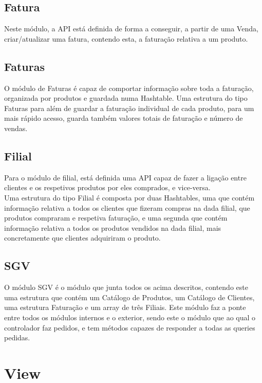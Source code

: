 \documentclass[a4paper]{report}
\begin{document}
\subsection{Fatura}

Neste módulo, a API está definida de forma a conseguir, a partir de uma Venda,
criar/atualizar uma fatura, contendo esta, a faturação relativa a um produto.

\subsection{Faturas}

O módulo de Faturas é capaz de comportar informação sobre toda a faturação,
organizada por produtos e guardada numa Hashtable. Uma estrutura do tipo Faturas
para além de guardar a faturação individual de cada produto, para um mais rápido 
acesso, guarda também valores totais de faturação e número de vendas.

\subsection{Filial}

Para o módulo de filial, está definida uma API capaz de fazer a ligação entre 
clientes e os respetivos produtos por eles comprados, e vice-versa.\\
Uma estrutura do tipo Filial é composta por duas Hashtables, uma que contém
informação relativa a todos os clientes que fizeram compras na dada filial, 
que produtos compraram e respetiva faturação, e uma segunda que contém 
informação relativa a todos os produtos vendidos na dada filial, mais 
concretamente que clientes adquiriram o produto.

\subsection{SGV}

O módulo SGV é o módulo que junta todos os acima descritos, contendo este uma estrutura
que contém um Catálogo de Produtos, um Catálogo de Clientes, uma estrutura Faturação e 
um array de três Filiais. Este módulo faz a ponte entre todos os módulos internos e o 
exterior, sendo este o módulo que ao qual o controlador faz pedidos, e tem 
métodos capazes de responder a todas as queries pedidas.


\section{View}
\end{document}
